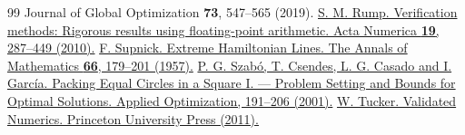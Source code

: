 \begin{thebibliography}{99}
{Journal of Global Optimization \textbf{73}, 547--565 (2019).}
\href{https://doi.org/10.1017/s096249291000005x}{S. M. Rump. Verification methods: Rigorous results using floating-point arithmetic.
Acta Numerica \textbf{19}, 287--449 (2010).}
\href{https://doi.org/10.2307/1970124}{F. Supnick. Extreme Hamiltonian Lines.
The Annals of Mathematics \textbf{66}, 179--201 (1957).}
\href{https://doi.org/10.1007/978-1-4613-0295-7_14}{P. G. Szabó, T. Csendes, L. G. Casado and I. García. Packing Equal Circles in a Square I. --- Problem Setting and Bounds for Optimal Solutions.
Applied Optimization, 191--206 (2001).}
\href{https://doi.org/10.1515/9781400838974}{W. Tucker. Validated Numerics.
Princeton University Press (2011).}
\end{thebibliography}
